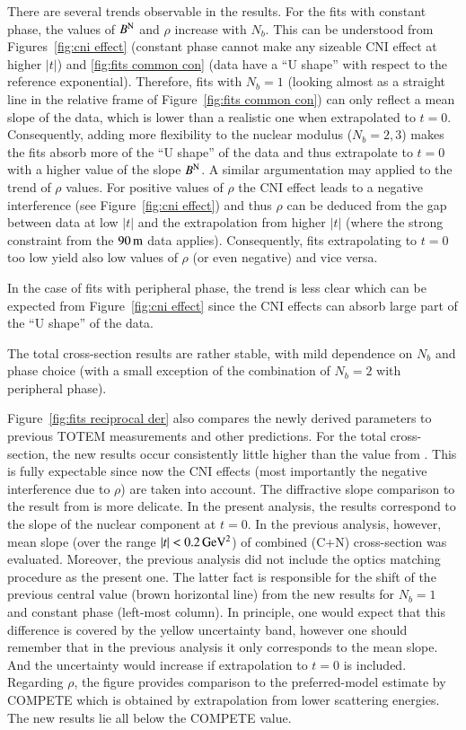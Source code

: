 There are several trends observable in the results. For the fits with constant phase, the values of $B^{\rm N}$ and $\rho$ increase with $N_b$. This can be understood from Figures~\ref{fig:cni effect} (constant phase cannot make any sizeable CNI effect at higher $|t|$) and \ref{fig:fits common con} (data have a ``U shape'' with respect to the reference exponential). Therefore, fits with $N_b = 1$ (looking almost as a straight line in the relative frame of Figure~\ref{fig:fits common con}) can only reflect a mean slope of the data, which is lower than a realistic one when extrapolated to $t = 0$. Consequently, adding more flexibility to the nuclear modulus ($N_b = 2, 3$) makes the fits absorb more of the ``U shape'' of the data and thus extrapolate to $t = 0$ with a higher value of the slope $B^{\rm N}$. A similar argumentation may applied to the trend of $\rho$ values. For positive values of $\rho$ the CNI effect leads to a negative interference (see Figure~\ref{fig:cni effect}) and thus $\rho$ can be deduced from the gap between data at low $|t|$ and the extrapolation from higher $|t|$ (where the strong constraint from the $90\,{\rm m}$ data applies). Consequently, fits extrapolating to $t = 0$ too low yield also low values of $\rho$ (or even negative) and vice versa.

In the case of fits with peripheral phase, the trend is less clear which can be expected from Figure~\ref{fig:cni effect} since the CNI effects can absorb large part of the ``U shape'' of the data.

The total cross-section results are rather stable, with mild dependence on $N_b$ and phase choice (with a small exception of the combination of $N_b = 2$ with peripheral phase).

Figure~\ref{fig:fits reciprocal der} also compares the newly derived parameters to previous TOTEM measurements and other predictions. For the total cross-section, the new results occur consistently little higher than the value from \cite{prl111}. This is fully expectable since now the CNI effects (most importantly the negative interference due to $\rho$) are taken into account. The diffractive slope comparison to the result from \cite{prl111} is more delicate. In the present analysis, the results correspond to the slope of the nuclear component at $t = 0$. In the previous analysis, however, mean slope (over the range $|t| < 0.2\,{\rm GeV^2}$) of combined (C+N) cross-section was evaluated. Moreover, the previous analysis did not include the optics matching procedure as the present one. The latter fact is responsible for the shift of the previous central value (brown horizontal line) from the new results for $N_b = 1$ and constant phase (left-most column). In principle, one would expect that this difference is covered by the yellow uncertainty band, however one should remember that in the previous analysis it only corresponds to the mean slope. And the uncertainty would increase if extrapolation to $t = 0$ is included.
%
Regarding $\rho$, the figure provides comparison to the preferred-model estimate by COMPETE \cite{compete} which is obtained by extrapolation from lower scattering energies. The new results lie all below the COMPETE value.

